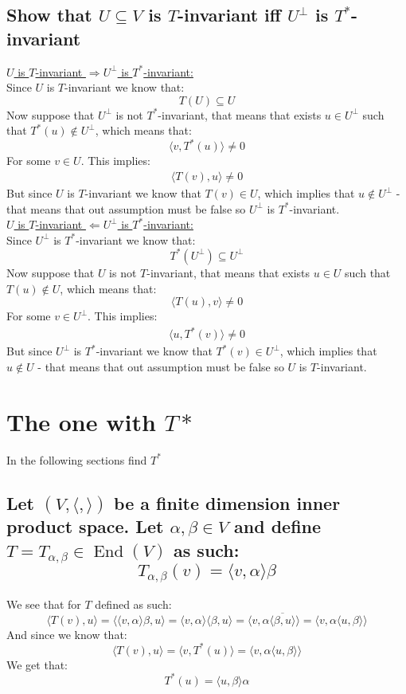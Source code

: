 \documentclass[11pt,a4paper]{article}
\theoremstyle{plain}
\DeclareMathOperator{\End}{End}
\begin{document}
	\subsection{Show that $U\subseteq V$ is $T$-invariant iff $U^\bot$ is
	$T^*$-invariant}
	\underline{$U$ is $T$-invariant $\Rightarrow U^\bot$ is $T^*$-invariant:} \\ 
	Since $U$ is $T$-invariant we know that:
	\[
		T(U) \subseteq U
	\]
	Now suppose that $U^\bot$ is not $T^*$-invariant, that means that exists
	$u\in U^\bot$ such that $T^*(u)\notin U^\bot$, which means that:
	\[
		\langle v, T^*(u)\rangle \neq 0
	\]
	For some $v\in U$. This implies:
	\begin{align*}
		\langle T(v), u \rangle \neq 0
	\end{align*}
	But since $U$ is $T$-invariant we know that $T(v)\in U$, which implies
	that $u\notin U^\bot$ - that means that out assumption must be false
	so $U^\bot$ is $T^*$-invariant. \\
	\underline{$U$ is $T$-invariant $\Leftarrow U^\bot$ is $T^*$-invariant:} \\ 
	Since $U^\bot$ is $T^*$-invariant we know that:
	\[
		T^*(U^\bot) \subseteq U^\bot
	\]
	Now suppose that $U$ is not $T$-invariant, that means that exists
	$u\in U$ such that $T(u)\notin U$, which means that:
	\[
		\langle T(u), v\rangle \neq 0
	\]
	For some $v\in U^\bot$. This implies:
	\begin{align*}
		\langle u, T^*(v) \rangle \neq 0
	\end{align*}
	But since $U^\bot$ is $T^*$-invariant we know that $T^*(v)\in U^\bot$, 
	which implies that $u\notin U$ - that means that out assumption must be
	false so $U$ is $T$-invariant. \\
	
	\newpage

	\section{The one with $T*$}
	In the following sections find $T^*$

	\subsection{Let $(V,\langle , \rangle)$ be a finite dimension inner product
	space. Let $\alpha,\beta\in V$ and define $T=T_{\alpha,\beta}\in\End(V)$ 
	as such:
	\[
	T_{\alpha,\beta}(v) = \langle v, \alpha \rangle \beta
	\]}
	We see that for $T$ defined as such:
	\[
		\langle T(v), u \rangle = 
		\langle \langle v, \alpha \rangle \beta, u \rangle = 
		\langle v, \alpha \rangle \langle \beta, u \rangle = 
		\langle v, \alpha \overline{\langle \beta, u \rangle} \rangle = 
		\langle v, \alpha \langle u, \beta \rangle \rangle
	\]
	And since we know that:
	\[
		\langle T(v), u\rangle = \langle v, T^*(u)\rangle = 
		\langle v, \alpha \langle u, \beta \rangle \rangle
	\]
	We get that:
	\[
		T^*(u) = 
		\langle u, \beta \rangle \alpha
	\]
\end{document}
